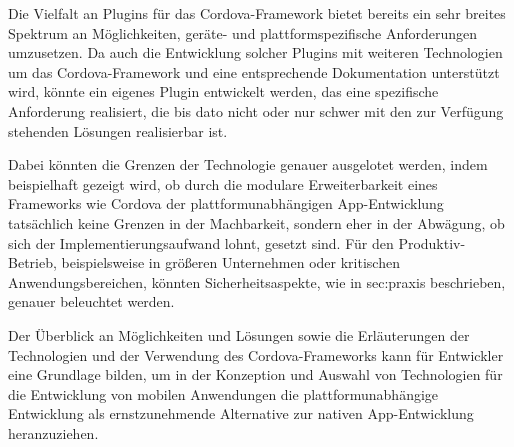 Die Vielfalt an Plugins für das Cordova-Framework bietet bereits ein sehr breites Spektrum an Möglichkeiten, geräte- und plattformspezifische Anforderungen umzusetzen. Da auch die Entwicklung solcher Plugins mit weiteren Technologien um das Cordova-Framework und eine entsprechende Dokumentation unterstützt wird, könnte ein eigenes Plugin entwickelt werden, das eine spezifische Anforderung realisiert, die bis dato nicht oder nur schwer mit den zur Verfügung stehenden Lösungen realisierbar ist.

Dabei könnten die Grenzen der Technologie genauer ausgelotet werden, indem beispielhaft gezeigt wird, ob durch die modulare Erweiterbarkeit eines Frameworks wie Cordova der plattformunabhängigen App-Entwicklung tatsächlich keine Grenzen in der Machbarkeit, sondern eher in der Abwägung, ob sich der Implementierungsaufwand lohnt, gesetzt sind.
Für den Produktiv-Betrieb, beispielsweise in größeren Unternehmen oder kritischen Anwendungsbereichen, könnten Sicherheitsaspekte, wie in {sec:praxis} beschrieben, genauer beleuchtet werden. 


Der Überblick an Möglichkeiten und Lösungen sowie die Erläuterungen der Technologien und der Verwendung des Cordova-Frameworks kann für Entwickler eine Grundlage bilden, um in der Konzeption und Auswahl von Technologien für die Entwicklung von mobilen Anwendungen die plattformunabhängige Entwicklung als ernstzunehmende Alternative zur nativen App-Entwicklung heranzuziehen.

